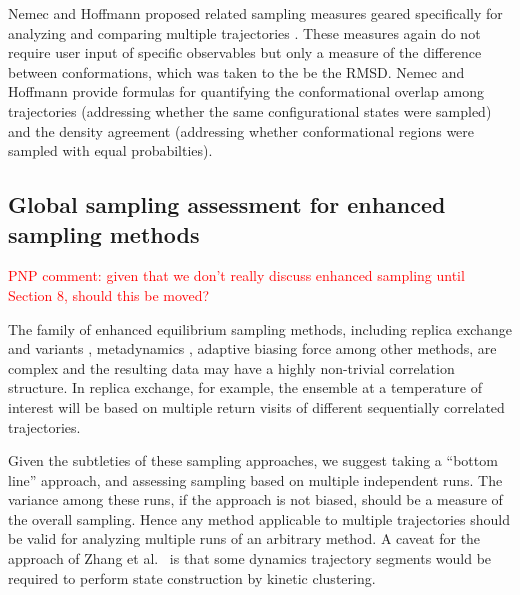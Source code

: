 Nemec and Hoffmann proposed related sampling measures geared specifically for analyzing and comparing multiple trajectories \cite{Nemec2017}.
These measures again do not require user input of specific observables but only a measure of the difference between conformations, which was taken to the be the RMSD.
Nemec and Hoffmann provide formulas for quantifying the conformational overlap among trajectories (addressing whether the same configurational states were sampled) and the density agreement (addressing whether conformational regions were  sampled with equal probabilties).


\subsection{Global sampling assessment for enhanced sampling methods}
\textcolor{red}{PNP comment: given that we don't really discuss enhanced sampling until Section 8, should this be moved?}

The family of enhanced equilibrium sampling methods, including replica exchange and variants \cite{Swendsen-1986,Sugita1999,Okamoto-2000}, metadynamics \cite{Bussi2006a,Laio2008}, adaptive biasing force \cite{Darve2001,Darve2008,Comer2015} among other methods, are complex and the resulting data may have a highly non-trivial correlation structure.
In replica exchange, for example, the ensemble at a temperature of interest will be based on multiple return visits of different sequentially correlated trajectories.

Given the subtleties of these sampling approaches, we suggest taking a ``bottom line'' approach, and assessing sampling based on multiple independent runs.
The variance among these runs, if the approach is not biased, should be a measure of the overall sampling.
Hence any method applicable to multiple trajectories should be valid for analyzing multiple runs of an arbitrary method.
A caveat for the approach of Zhang et al.\ \cite{Zhang2010} is that some dynamics trajectory segments would be required to perform state construction by kinetic clustering.
